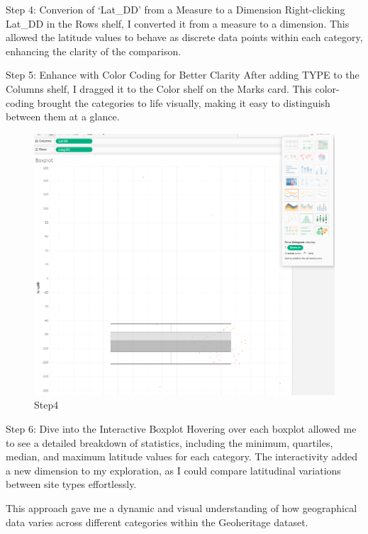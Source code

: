 \documentclass[
  letterpaper,
  DIV=11,
  numbers=noendperiod]{scrreprt}
\begin{document}
Step 4: Converion of `Lat\_DD' from a Measure to a Dimension
Right-clicking Lat\_DD in the Rows shelf, I converted it from a measure
to a dimension. This allowed the latitude values to behave as discrete
data points within each category, enhancing the clarity of the
comparison.

Step 5: Enhance with Color Coding for Better Clarity After adding TYPE
to the Columns shelf, I dragged it to the Color shelf on the Marks card.
This color-coding brought the categories to life visually, making it
easy to distinguish between them at a glance.

\begin{figure}[H]

{\centering \includegraphics{Step4_ACT.png}

}

\caption{Step4}

\end{figure}%

Step 6: Dive into the Interactive Boxplot Hovering over each boxplot
allowed me to see a detailed breakdown of statistics, including the
minimum, quartiles, median, and maximum latitude values for each
category. The interactivity added a new dimension to my exploration, as
I could compare latitudinal variations between site types effortlessly.

This approach gave me a dynamic and visual understanding of how
geographical data varies across different categories within the
Geoheritage dataset.
\end{document}
